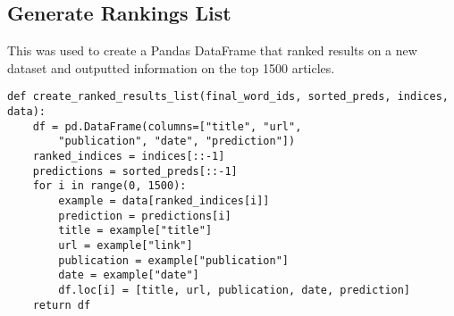 \subsection{Generate Rankings List}
This was used to create a Pandas DataFrame that ranked results on a new dataset and outputted information on the top 1500 articles.

\begin{verbatim}
def create_ranked_results_list(final_word_ids, sorted_preds, indices, data):
    df = pd.DataFrame(columns=["title", "url", 
    	"publication", "date", "prediction"])
    ranked_indices = indices[::-1]
    predictions = sorted_preds[::-1]
    for i in range(0, 1500):
        example = data[ranked_indices[i]]
        prediction = predictions[i]
        title = example["title"]
        url = example["link"]
        publication = example["publication"]
        date = example["date"]
        df.loc[i] = [title, url, publication, date, prediction]
    return df
\end{verbatim}